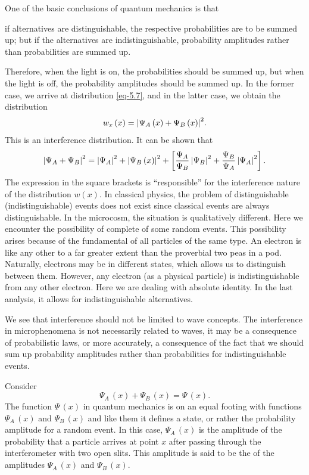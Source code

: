 One of the basic conclusions of quantum mechanics is that 
\begin{mybox}{}
if alternatives are distinguishable, the respective probabilities are to be
summed up; but if the alternatives are indistinguishable, probability
amplitudes rather than probabilities are summed up. 
\end{mybox}
Therefore, when the light is on, the probabilities should be summed up, but when the light is off, the probability amplitudes should be summed up. In the former
case, we arrive at distribution \eqref{eq-5.7}, and in the latter case, we obtain the distribution
\begin{equation}%
w_{x} \, (x) =  \abs{\Psi_{A} \, (x) +  \Psi_{B} \, (x)}^{2}.
\label{eq-5.8}
\end{equation}
This is an interference distribution. It can be shown that
\begin{equation}%
 \abs{\Psi_{A} +  \Psi_{B}}^{2} =  \abs{\Psi_{A}}^{2} +  \abs{\Psi_{B} \, (x)}^{2} + \left[ \frac{\Psi_{A}}{\Psi_{B}} \,\abs{\Psi_{B}}^{2} + \frac{\Psi_{B}}{\Psi_{A}}\, \abs{\Psi_{A}}^{2} \right].
\label{eq-5.9}
\end{equation}
The expression in the square brackets is ``responsible'' for the
interference nature of the distribution $w(x)$. In classical physics, the
problem of distinguishable (indistinguishable) events does not exist since
classical events are always distinguishable. In the microcosm, the
situation is qualitatively different. Here we encounter the possibility of
complete  of some random events. This possibility arises because of the fundamental  of all particles of the same type. An electron is like any other to a far greater extent than the proverbial two peas in a pod. Naturally, electrons may be in different
states, which allows us to distinguish between them. However, any
electron (as a physical particle) is indistinguishable from any other
electron. Here we are dealing with absolute identity. In the last analysis,
it allows for indistinguishable alternatives. 

We see that interference should not be limited to wave concepts. The
interference in microphenomena is not necessarily related to waves, it
may be a consequence of probabilistic laws, or more accurately,
a consequence of the fact that we should sum up probability amplitudes
rather than probabilities for indistinguishable events.

 Consider
\begin{equation}%
 \Psi_{A} \, (x) +  \Psi_{B} \, (x)= \Psi \, (x).
\label{eq-5.10}
\end{equation}
The function $\Psi \, (x) $ in quantum mechanics is on an equal footing with
functions $ \Psi_{A} \, (x)$ and $ \Psi_{B} \, (x)$ and like them it defines a state, or rather the probability amplitude for a random event. In this case, $ \Psi_{A} \, (x)$ is the amplitude of the probability that a particle arrives at point $x$ after passing through the interferometer with two open slits. This amplitude is said to be the  of the amplitudes $ \Psi_{A} \, (x)$ and $ \Psi_{B} \, (x)$.


